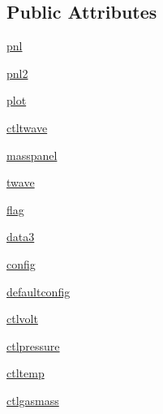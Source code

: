 \subsection*{Public Attributes}
\begin{DoxyCompactItemize}
\item 
\hyperlink{class_uni_dec_1_1unidec__modules_1_1_i_m__windows_1_1_i_m_tools_a75395e4d0de0fe12fd017979df03e933}{pnl}
\item 
\hyperlink{class_uni_dec_1_1unidec__modules_1_1_i_m__windows_1_1_i_m_tools_a36773eb6e48d8b7f16a75c32fd4059ef}{pnl2}
\item 
\hyperlink{class_uni_dec_1_1unidec__modules_1_1_i_m__windows_1_1_i_m_tools_ac48698a7f8495404f2dc5bcd0d61acfc}{plot}
\item 
\hyperlink{class_uni_dec_1_1unidec__modules_1_1_i_m__windows_1_1_i_m_tools_a53837ede1b8c07bd7ce8c11e26a6ae09}{ctltwave}
\item 
\hyperlink{class_uni_dec_1_1unidec__modules_1_1_i_m__windows_1_1_i_m_tools_ae803f9fde30f1378971c56f0150e7535}{masspanel}
\item 
\hyperlink{class_uni_dec_1_1unidec__modules_1_1_i_m__windows_1_1_i_m_tools_a5b3ea1abc0ceb62ab6dcdd664788b6b8}{twave}
\item 
\hyperlink{class_uni_dec_1_1unidec__modules_1_1_i_m__windows_1_1_i_m_tools_a15247b3730136ba54cfe25b8a9d43a82}{flag}
\item 
\hyperlink{class_uni_dec_1_1unidec__modules_1_1_i_m__windows_1_1_i_m_tools_a87e31c343a7bf7bb4cb87feda1f4869a}{data3}
\item 
\hyperlink{class_uni_dec_1_1unidec__modules_1_1_i_m__windows_1_1_i_m_tools_acb95efc8b39730019e369845bb760a84}{config}
\item 
\hyperlink{class_uni_dec_1_1unidec__modules_1_1_i_m__windows_1_1_i_m_tools_ab85f0a6b0a0a568cc975498b16bdce5a}{defaultconfig}
\item 
\hyperlink{class_uni_dec_1_1unidec__modules_1_1_i_m__windows_1_1_i_m_tools_af44f8439f54602ea1ffc56cbf5c79f14}{ctlvolt}
\item 
\hyperlink{class_uni_dec_1_1unidec__modules_1_1_i_m__windows_1_1_i_m_tools_aa21ba9f8f3a90a835124f638d81e45e7}{ctlpressure}
\item 
\hyperlink{class_uni_dec_1_1unidec__modules_1_1_i_m__windows_1_1_i_m_tools_a829fedae02426e666cefb7d1ecabb3c8}{ctltemp}
\item 
\hyperlink{class_uni_dec_1_1unidec__modules_1_1_i_m__windows_1_1_i_m_tools_ad753af4b6e5d29665e71f62b71ebc8f6}{ctlgasmass}
\item 

\end{DoxyCompactItemize}
